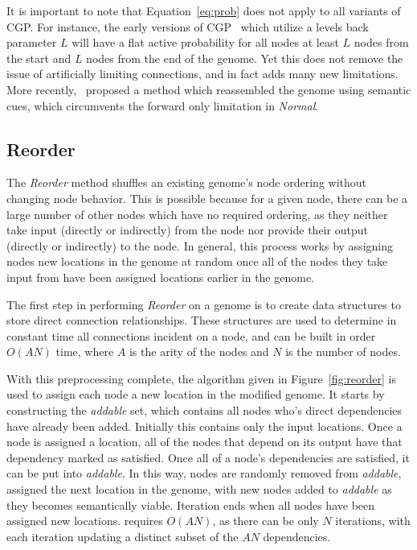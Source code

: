\documentclass[journal]{IEEEtran}
\begin{document}
It is important to note that Equation~\ref{eq:prob} does not apply to all variants of CGP.
For instance, the early versions of CGP~\cite{miller:2011:chapter2} which utilize a
levels back parameter $L$ will have
a flat active probability for all nodes at least $L$ nodes from the start and $L$ nodes from the end
of the genome.  Yet this does not remove the issue of artificially limiting connections,
and in fact adds many new limitations.  More recently,~\cite{cai:2005:ircgp} proposed
a method which reassembled the genome using semantic cues, which circumvents the
forward only limitation in \emph{Normal}.
\subsection{Reorder}
\label{sec:reorder}
The \emph{Reorder} method shuffles an existing genome's node ordering without
changing node behavior.  This is possible because for a given node, there can
be a large number of other nodes which have no required ordering,
as they neither take input (directly or indirectly) from the node nor provide their
output (directly or indirectly) to the node.  In general, this process works by assigning nodes new
locations in the genome at random once all of the nodes they take input from have been assigned
locations earlier in the genome.

The first step in performing \emph{Reorder} on a genome is to create
data structures to store direct connection relationships.  These structures are used
to determine in constant time all connections incident on a node, and 
can be built in order $O(AN)$ time, where $A$ is the arity of the nodes
and $N$ is the number of nodes.

With this preprocessing complete, the  algorithm given in Figure~\ref{fig:reorder}
is used to assign each node a new location in the modified genome.
It starts by constructing the \emph{addable} set, which contains all nodes who's direct
dependencies have already been added.  Initially this contains only the input locations.
Once a node is assigned a location, all of the nodes that depend on its output
have that dependency marked as satisfied.  Once all of a node's dependencies
are satisfied, it can be put into \emph{addable}.  In this way, nodes are
randomly removed from \emph{addable}, assigned the next location
in the genome, with new nodes added to \emph{addable} as they becomes semantically
viable.  Iteration ends when all nodes have been assigned new locations.
 requires $O(AN)$, as there can be only $N$ iterations,
with each iteration updating a distinct subset of the $AN$ dependencies.
\end{document}
